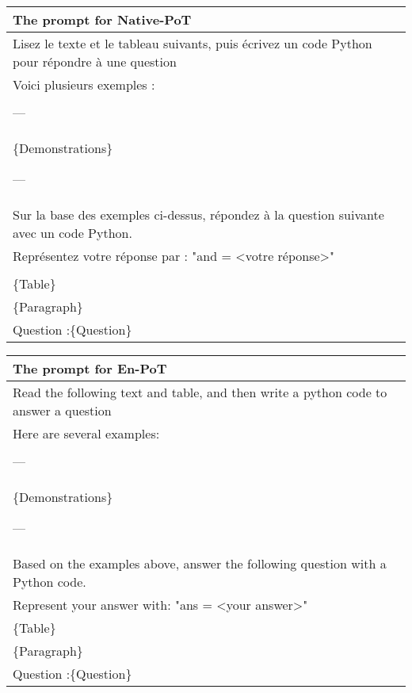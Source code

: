 \begin{tabular}{p{}}
\toprule
\textbf{The prompt for Native-PoT} \\
\midrule
Lisez le texte et le tableau suivants, puis écrivez un code Python pour répondre à une question\\
Voici plusieurs exemples :\\
\\
---\\

\{Demonstrations\}

---\\

Sur la base des exemples ci-dessus, répondez à la question suivante avec un code Python.\\
Représentez votre réponse par : "and = <votre réponse>"\\
\\
\{Table\}\\
\{Paragraph\}\\
Question :\{Question\}\\
\bottomrule
\end{tabular}

\begin{tabular}{p{}}
\toprule
\textbf{The prompt for En-PoT} \\
\midrule
Read the following text and table, and then write a python code to answer a question\\
Here are several examples:\\
\\
---\\

\{Demonstrations\}

---\\
Based on the examples above, answer the following question with a Python code.\\
Represent your answer with: "ans = <your answer>"
\\
\{Table\}\\
\{Paragraph\}\\
Question :\{Question\}\\
\bottomrule
\end{tabular}